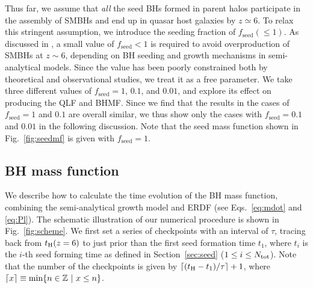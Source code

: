 \documentclass[twocolumn, twocolappendix]{aastex63}
\newcommand{\tlife}{\tau}
\newcommand{\fseed}{f_\mathrm{seed}}
\begin{document}
\begin{CJK*}{UTF8}{gbsn}
Thus far, we assume that {\it all} the seed BHs formed in parent halos participate in the assembly of SMBHs and 
end up in quasar host galaxies by $z\simeq 6$.
To relax this stringent assumption, we introduce the seeding fraction of $\fseed (\leq 1)$.
As discussed in \citet{2009ApJ...696.1798T}, a small value of $\fseed <1$ is required to avoid overproduction of SMBHs at $z\sim 6$,
depending on BH seeding and growth mechanisms in semi-analytical models.
Since the value has been poorly constrained both by theoretical and observational studies, we treat it as a free parameter.
We take three different values of $\fseed = 1$, $0.1$, and $0.01$, and explore its effect on producing the QLF and BHMF.
Since we find that the results in the cases of $\fseed = 1$ and $0.1$ are overall similar,
we thus show only the cases with $\fseed=0.1$ and $0.01$ in the following discussion.
Note that the seed mass function shown in Fig.~\ref{fig:seedmf} is given with $\fseed = 1$.



\subsection{BH mass function}\label{sec:MF}

We describe how to calculate the time evolution of the BH mass function, 
combining the semi-analytical growth model and ERDF (see Eqs.~\ref{eq:mdot} and \ref{eq:Pl}).
The schematic illustration of our numerical procedure is shown in Fig.~\ref{fig:scheme}. 
We first set a series of checkpoints with an interval of $\tlife$, 
tracing back from $t_{\rm H}(z=6)$ to just prior than the first seed formation time $t_1$, where $t_i$ is the $i$-th seed forming time
as defined in Section~\ref{sec:seed} ($1\leq i\leq N_{\rm tot}$).
Note that the number of the checkpoints is given by $\lceil (t_{\rm H}-t_1)/\tau \rceil+1$, where $\lceil x\rceil \equiv {\rm min}\{n \in \mathbb{Z}~ |~x\leq n\}$.



\end{CJK*}
\end{document}
